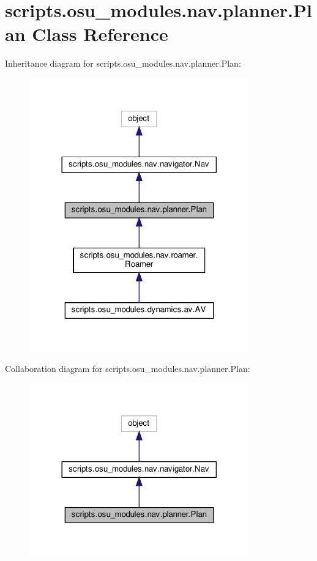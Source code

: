 \hypertarget{classscripts_1_1osu__modules_1_1nav_1_1planner_1_1Plan}{}\section{scripts.\+osu\+\_\+modules.\+nav.\+planner.\+Plan Class Reference}
\label{classscripts_1_1osu__modules_1_1nav_1_1planner_1_1Plan}


Inheritance diagram for scripts.\+osu\+\_\+modules.\+nav.\+planner.\+Plan\+:
\nopagebreak
\begin{figure}[H]
\begin{center}
\leavevmode
\includegraphics[width=269pt]{d4/de2/classscripts_1_1osu__modules_1_1nav_1_1planner_1_1Plan__inherit__graph}
\end{center}
\end{figure}


Collaboration diagram for scripts.\+osu\+\_\+modules.\+nav.\+planner.\+Plan\+:
\nopagebreak
\begin{figure}[H]
\begin{center}
\leavevmode
\includegraphics[width=269pt]{d0/d78/classscripts_1_1osu__modules_1_1nav_1_1planner_1_1Plan__coll__graph}
\end{center}
\end{figure}
